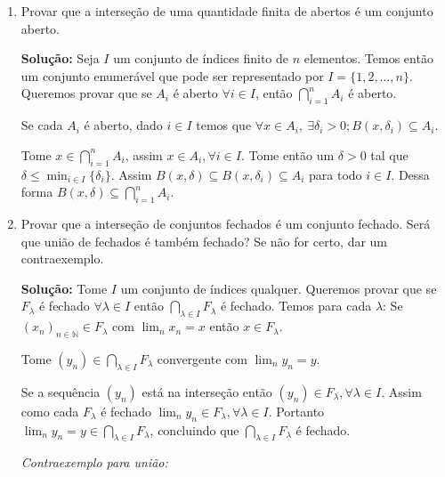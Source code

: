 \documentclass[12pt]{article}
\newcommand{\N}{\mathbb{N}}
\newcommand{\dps}{\displaystyle}
\begin{document}
\begin{enumerate}
\textbf{Solu\c{c}\~ao:} Seja $\{A_\lambda: \lambda \in \Lambda\}$ uma fam\'ilia de abertos, onde $\Lambda$ \'e um conjunto de \'indices (poss\'ivelmente infinito, n\~ao enumer\'avel). Consideremos a união:
$$
A:= \bigcup_{\lambda \in \Lambda} A_\lambda.
$$
Seja $z\in A.$ Logo $z\in A_\lambda$ para algum índice $\lambda.$ Dado que $A_\lambda$ é aberto, existe $\epsilon>0$ tal que $B(z;\epsilon)\subseteq A_\lambda.$ Logo $B(z;\epsilon) \subseteq A.$ Conclu\'imos que $A$ \'e aberto.

\item Provar que a interse\c{c}\~ao de uma quantidade finita de abertos \'e um conjunto aberto.

\textbf{Solução:} Seja $I$ um conjunto de índices finito de $n$ elementos. Temos então um conjunto enumerável que pode ser representado por $I=\{1,2,\ldots,n\}$. Queremos provar que se $A_i$ é aberto $\forall i \in I$, então $\dps\bigcap_{i=1}^nA_i$ é aberto.

Se cada $A_i$ é aberto, dado $i\in I$ temos que $\forall x\in A_i,~\exists\delta_i>0;B(x,\delta_i)\subseteq A_i$.

Tome $x\in\dps\bigcap_{i=1}^nA_i$, assim $x\in A_i,\forall i \in I$. Tome então um $\delta>0$ tal que $\delta\leq\dps\min_{i\in I}\{\delta_i\}$. Assim $B(x,\delta)\subseteq B(x,\delta_i)\subseteq A_i$ para todo $i\in I$. Dessa forma $B(x,\delta)\subseteq\dps\bigcap_{i=1}^nA_i$.


\item Provar que a interse\c{c}\~ao de conjuntos fechados \'e um conjunto fechado. Ser\'a que uni\~ao de fechados \'e tamb\'em fechado? Se n\~ao for certo, dar um contraexemplo.

\textbf{Solução:} Tome $I$ um conjunto de índices qualquer. Queremos provar que se $F_\lambda$ é fechado $\forall\lambda \in I$ então $\dps\bigcap_{\lambda\in I}F_\lambda$ é fechado. Temos para cada $\lambda$: Se $(x_n)_{n\in\N}\in F_\lambda$ com $\dps\lim_nx_n=x$ então $x\in F_\lambda$.

Tome $(y_n)\in\dps\bigcap_{\lambda\in I}F_\lambda$ convergente com $\dps\lim_ny_n=y$.

Se a sequência $(y_n)$ está na interseção então $(y_n)\in F_\lambda,\forall\lambda\in I$. Assim como cada $F_\lambda$ é fechado $\dps\lim_ny_n\in F_\lambda,\forall\lambda\in I$. Portanto $\dps\lim_ny_n=y\in\dps\bigcap_{\lambda\in I}F_\lambda$, concluindo que $\dps\bigcap_{\lambda\in I}F_\lambda$ é fechado.

\textit{Contraexemplo para união:}


\end{enumerate}
\end{document}
